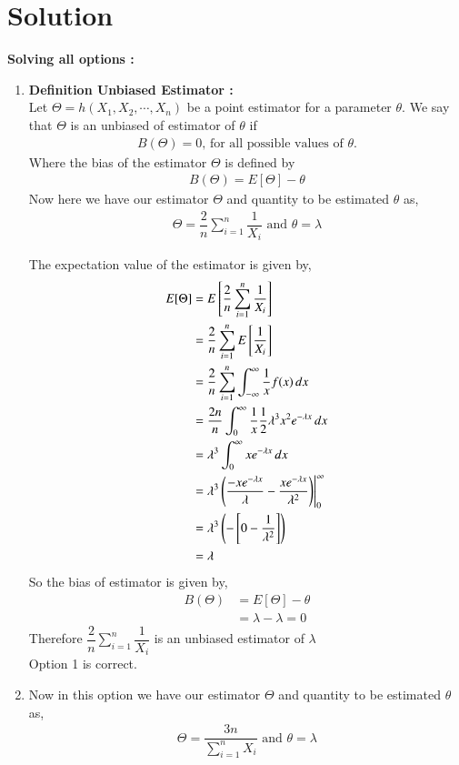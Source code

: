 \documentclass[journal,12pt,twocolumn]{IEEEtran}
\begin{document}
\section*{Solution}
\textbf{Solving all options : }
\begin{enumerate}
    \item 
    \textbf{Definition Unbiased Estimator : } \\ Let $\Theta = h(X_1,X_2, \cdots , X_n) $ be a point estimator for a parameter $ \theta $. We say that $ \Theta $ is an unbiased of estimator of $ \theta $ if
    \begin{align}
       B(\Theta )= 0 \text{, for all possible values of $\theta$.}
    \end{align}
Where the bias of the estimator $ \Theta $ is defined by 
\begin{align}
    B(\Theta ) = E[\Theta ] - \theta
\end{align}
 Now here we have our estimator $ \Theta$ and quantity to be estimated $ \theta $ as,
 \begin{align}
     \Theta = \dfrac{2}{n} \sum_{i=1}^{n} \dfrac{1}{X_i} \text{  and  }
     \theta = \lambda
 \end{align}

The expectation value of the estimator is given by, 
\begin{align}
    E[\Theta ] &= E  \left[   \dfrac{2}{n} \sum_{i=1}^{n} \dfrac{1}{X_i}  \right] \\
    & = \dfrac{2}{n} \sum_{i=1}^{n} E  \left[ \dfrac{1}{X_i}  \right] \\
    & =  \dfrac{2}{n} \sum_{i=1}^{n} \int_{-\infty}^{\infty} \dfrac{1}{x} f(x)\,dx \\
    \label{eq1}
    & = \dfrac{2n}{n} \int_{0}^{\infty} \dfrac{1}{x} \dfrac{1}{2} \lambda^3x^2e^{-\lambda x}\,dx \\
    & = \lambda^3  \int_{0}^{\infty}  x e^{-\lambda x}\,dx \\
    & = \lambda^3   \left( \dfrac{-x e^{-\lambda x}}{\lambda}- \dfrac{x e^{-\lambda x}}{\lambda^2}\right) \Biggr|_{0}^{\infty} \\
    & = \lambda^3 \left(-  \left[ 0 -   \dfrac{1}{\lambda^2}  \right]\right) \\
    &= \lambda
\end{align}
So the bias of estimator is given by,
\begin{align}
    B(\Theta) &= E[\Theta] - \theta  \\
    &= \lambda - \lambda = 0
\end{align}
Therefore $\dfrac{2}{n} \sum_{i=1}^{n} \dfrac{1}{X_i} $ is an unbiased estimator of $ \lambda$ \\
Option 1 is correct. \\
\item
 Now in this option we have our estimator $ \Theta$ and quantity to be estimated $ \theta $ as,
 \begin{align}
     \Theta = \dfrac{3n}{\sum_{i=1}^{n} X_i } \text{  and  }
     \theta = \lambda
 \end{align}


\end{enumerate}
\end{document}
